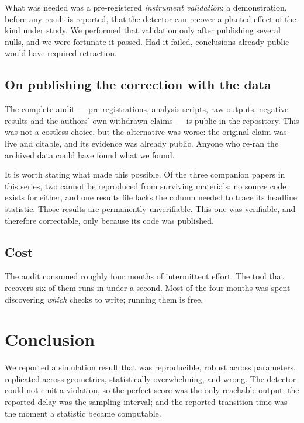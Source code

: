 \documentclass[11pt,letterpaper]{article}
\begin{document}
What was needed was a pre-registered \emph{instrument validation}: a
demonstration, before any result is reported, that the detector can
recover a planted effect of the kind under study. We performed that
validation only after publishing several nulls, and we were fortunate it
passed. Had it failed, conclusions already public would have required
retraction.

\subsection{On publishing the correction with the data}

The complete audit --- pre-registrations, analysis scripts, raw outputs,
negative results and the authors' own withdrawn claims --- is public in
the repository. This was not a costless choice, but the alternative was
worse: the original claim was live and citable, and its evidence was
already public. Anyone who re-ran the archived data could have found
what we found.

It is worth stating what made this possible. Of the three companion
papers in this series, two cannot be reproduced from surviving
materials: no source code exists for either, and one results file lacks
the column needed to trace its headline statistic. Those results are
permanently unverifiable. This one was verifiable, and therefore
correctable, only because its code was published.

\subsection{Cost}

The audit consumed roughly four months of intermittent effort. The tool
that recovers six of them runs in under a second. Most of the four
months was spent discovering \emph{which} checks to write; running them
is free.

\section{Conclusion}

We reported a simulation result that was reproducible, robust across
parameters, replicated across geometries, statistically overwhelming,
and wrong. The detector could not emit a violation, so the perfect score
was the only reachable output; the reported delay was the sampling
interval; and the reported transition time was the moment a statistic
became computable.
\end{document}
